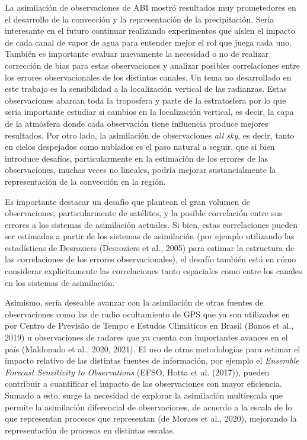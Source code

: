 \documentclass[12pt,oneside,a4paper]{reedthesis}
\begin{document}
La asimilación de observaciones de ABI mostró resultados muy prometedores en el desarrollo de la convección y la representación de la precipitación. Sería interesante en el futuro continuar realizando experimentos que aíslen el impacto de cada canal de vapor de agua para entender mejor el rol que juega cada uno. También es importante evaluar nuevamente la necesidad o no de realizar corrección de bias para estas observaciones y analizar posibles correlaciones entre los errores observacionales de los distintos canales. Un tema no desarrollado en este trabajo es la sensibilidad a la localización vertical de las radianzas. Estas observaciones abarcan toda la troposfera y parte de la estratosfera por lo que seria importante estudiar si cambios en la localización vertical, es decir, la capa de la atmósfera donde cada observación tiene influencia produce mejores resultados. Por otro lado, la asimilación de observaciones \emph{all sky}, es decir, tanto en cielos despejados como nublados es el paso natural a seguir, que si bien introduce desafíos, particularmente en la estimación de los errores de las observaciones, muchas veces no lineales, podría mejorar sustancialmente la representación de la convección en la región.

Es importante destacar un desafío que plantean el gran volumen de observaciones, particularmente de satélites, y la posible correlación entre sus errores a los sistemas de asimilación actuales. Si bien, estas correlaciones pueden ser estimadas a partir de los sistemas de asimilación (por ejemplo utilizando las estadísticas de Desroziers (Desroziers et al., 2005) para estimar la estructura de las correlaciones de los errores observacionales), el desafío también está en cómo considerar explicitamente las correlaciones tanto espaciales como entre los canales en los sistemas de asimilación.

Asimismo, sería deseable avanzar con la asimilación de otras fuentes de observaciones como las de radio ocultamiento de GPS que ya son utilizados en por Centro de Previsão de Tempo e Estudos Climáticos en Brasil (Banos et al., 2019) u observaciones de radares que ya cuenta con importantes avances en el país (Maldonado et al., 2020, 2021). El uso de otras metodologías para estimar el impacto relativo de las distintas fuentes de información, por ejemplo el \emph{Ensemble Forecast Sensitivity to Observations} (EFSO, Hotta et al. (2017)), pueden contribuir a cuantificar el impacto de las observaciones con mayor eficiencia. Sumado a esto, surge la necesidad de explorar la asimilación multiescala que permite la asimilación diferencial de observaciones, de acuerdo a la escala de lo que representan procesos que representan (de Moraes et al., 2020), mejorando la representación de procesos en distintas escalas.
\end{document}
